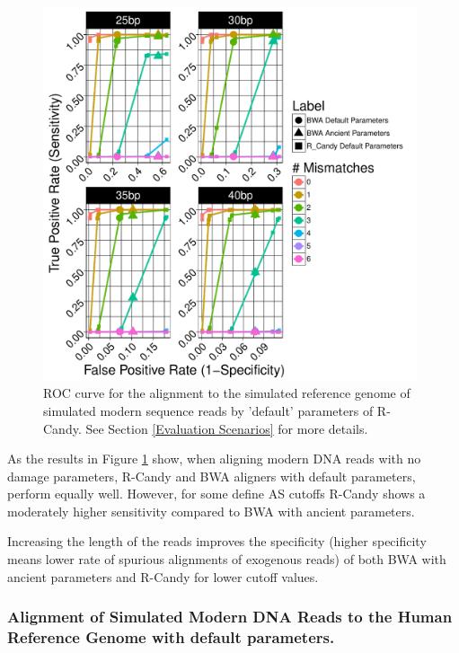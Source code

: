 \documentclass[11pt,a4paper]{report}
\begin{document}
\begin{figure}[H]
\centering
\includegraphics[width=11cm]{pictures/f_DS3_emp.pdf}
\caption{
ROC curve for the alignment to the simulated reference genome of simulated 
modern sequence reads by 'default' parameters of R-Candy. See Section 
\ref{Evaluation Scenarios} for more details.}
\label{DS3_emp}
\end{figure}


As the results in Figure \ref{DS3_emp} show, when aligning modern DNA reads with 
no damage parameters, R-Candy and BWA aligners with default parameters, perform
equally well. However, for some define AS cutoffs R-Candy shows a moderately higher 
sensitivity compared to BWA with ancient parameters.

Increasing the length of the reads improves the specificity (higher specificity 
means lower rate of spurious alignments of exogenous reads) of both BWA with 
ancient parameters and R-Candy for lower cutoff values.





\subsubsection{ Alignment of Simulated Modern DNA Reads to the Human Reference Genome with default parameters.}

\label{ Alignment of Simulated Modern DNA Reads to a the Human Reference Genome with
default parameters.}
\end{document}
